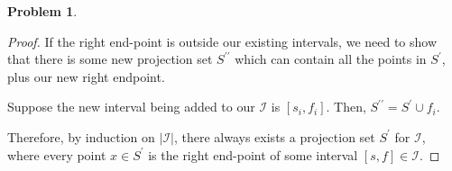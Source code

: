 \documentclass[11pt]{article}
\theoremstyle{definition}
\theoremstyle{definition}
\newtheorem{required}{Problem}
\theoremstyle{definition}
\begin{document}
\begin{required}
\begin{enumerate}[label=(\alph*)]
\begin{proof}
If the right end-point is outside our existing intervals, we need to show that there is some new projection set $S^{\prime\prime}$ which can contain all the points in $S^{\prime}$, plus our new right endpoint.

Suppose the new interval being added to our $\mathcal{I}$ is $[s_i, f_i]$. Then, $S^{\prime\prime} = S^{\prime} \cup {f_i}$.

Therefore, by induction on $|\mathcal{I}|$, there always exists a projection set $S^{\prime}$ for $\mathcal{I}$, where every point $x \in S^{\prime}$ is the right end-point of some interval $[s, f] \in \mathcal{I}$.

\end{proof}

\end{enumerate}
\end{required}
\end{document}
